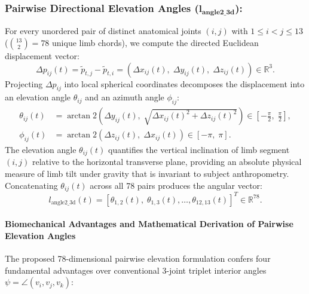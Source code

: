 \documentclass[preprint,12pt]{elsarticle}
\begin{document}
\subsubsection{Pairwise Directional Elevation Angles ($\mathbf{l_{\text{angle2\_3d}}}$):}
For every unordered pair of distinct anatomical joints $(i, j)$ with $1 \le i < j \le 13$ ($\binom{13}{2} = 78$ unique limb chords), we compute the directed Euclidean displacement vector:
\begin{equation}
    \Delta p_{ij}(t) = \tilde{p}_{t, j} - \tilde{p}_{t, i} = \left( \Delta x_{ij}(t), \; \Delta y_{ij}(t), \; \Delta z_{ij}(t) \right) \in \mathbb{R}^3.
\end{equation}
Projecting $\Delta p_{ij}$ into local spherical coordinates decomposes the displacement into an elevation angle $\theta_{ij}$ and an azimuth angle $\phi_{ij}$:
\begin{align}
    \theta_{ij}(t) &= \arctan2\left( \Delta y_{ij}(t), \; \sqrt{\Delta x_{ij}(t)^2 + \Delta z_{ij}(t)^2} \right) \in \left[ -\frac{\pi}{2}, \; \frac{\pi}{2} \right], \\
    \phi_{ij}(t)   &= \arctan2\left( \Delta z_{ij}(t), \; \Delta x_{ij}(t) \right) \in \left[ -\pi, \; \pi \right].
\end{align}
The elevation angle $\theta_{ij}(t)$ quantifies the vertical inclination of limb segment $(i, j)$ relative to the horizontal transverse plane, providing an absolute physical measure of limb tilt under gravity that is invariant to subject anthropometry. Concatenating $\theta_{ij}(t)$ across all 78 pairs produces the angular vector:
\begin{equation}
    l_{\text{angle2\_3d}}(t) = \left[ \theta_{1, 2}(t), \; \theta_{1, 3}(t), \dots, \theta_{12, 13}(t) \right]^T \in \mathbb{R}^{78}.
\end{equation}

\paragraph{Biomechanical Advantages and Mathematical Derivation of Pairwise Elevation Angles}
The proposed 78-dimensional pairwise elevation formulation confers four fundamental advantages over conventional 3-joint triplet interior angles $\psi = \angle(v_i, v_j, v_k)$:
\end{document}
